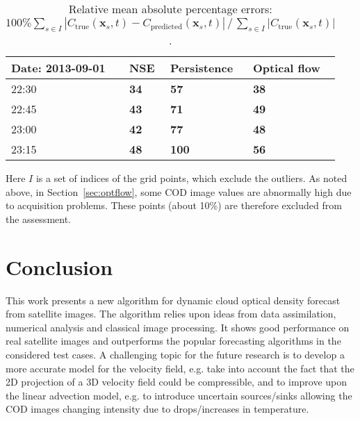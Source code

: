 \documentclass[onecolumn, 12pt, conference]{ieeeconf}
\begin{document}
\begin{table}
 \begin{center}
 \begin{tabular}{| l | l | l | l|}
 \hline
{\bf Date: 2013-09-01}     &      NSE           &      Persistence &      Optical flow         \\ \hline
22:30 	 &	\textbf{34} 	 &	\textbf{57} &      \textbf{38}   	\\\hline
22:45 	 &	\textbf{43} 	 &	\textbf{71} &      \textbf{49}	 	\\\hline
23:00 	 &	\textbf{42} 	 &	\textbf{77} &      \textbf{48}	 	\\\hline
23:15 	 &	\textbf{48} 	 &	\textbf{100} &      \textbf{56}	 	\\\hline
\end{tabular}
\caption{Relative mean absolute percentage errors: ${100\%\sum_{s\in I}|C_{\mathrm{true}}(\bm{x}_s,t)-C_{\mathrm{predicted}}(\bm{x}_s,t)|}\,/\,{\sum_{s\in I}|C_{\mathrm{true}}(\bm{x}_s,t)|}$.}
\end{center}
\end{table}
Here $I$ is a set of indices of the grid points, which exclude the outliers. As noted above, in Section~\ref{sec:optflow}, some COD image values are abnormally high due to acquisition problems. These points (about 10\%) are therefore excluded from the assessment.

\section{Conclusion}
\label{sec:conclusion}

This work presents a new algorithm for dynamic cloud optical density forecast from satellite images. The algorithm relies upon ideas from data assimilation, numerical analysis and classical image processing. It shows good performance on real satellite images and outperforms the popular forecasting algorithms in the considered test cases. A challenging topic for the future research is to develop a more accurate model for the velocity field, e.g. take into account the fact that the 2D projection of a 3D velocity field could be compressible, and to improve upon the linear advection model, e.g. to introduce uncertain sources/sinks allowing the COD images changing intensity due to drops/increases in temperature.
\end{document}

